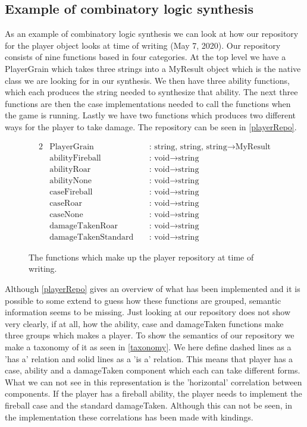 \subsection{Example of combinatory logic synthesis}
As an example of combinatory logic synthesis we can look at how our repository for the player object looks at time of writing (May 7, 2020). Our repository consists of nine functions based in four categories. At the top level we have a PlayerGrain which takes three strings into a MyResult object which is the native class we are looking for in our synthesis. We then have three ability functions, which each produces the string needed to synthesize that ability. The next three functions are then the case implementations needed to call the functions when the game is running. Lastly we have two functions which produces two different ways for the player to take damage. The repository can be seen in \autoref{playerRepo}.
\begin{figure}[H]
	\centering
	\begin{alignat*}{2}
	&\text{PlayerGrain}\; &&\text{: string, string, string} \to \text{MyResult}\\
	&\text{abilityFireball}\; &&\text{: void} \to \text{string}\\
	&\text{abilityRoar}\; &&\text{: void} \to \text{string}\\
	&\text{abilityNone}\; &&\text{: void} \to \text{string}\\
	&\text{caseFireball}\; &&\text{: void} \to \text{string}\\
	&\text{caseRoar}\; &&\text{: void} \to \text{string}\\
	&\text{caseNone}\; &&\text{: void} \to \text{string}\\
	&\text{damageTakenRoar}\; &&\text{: void} \to \text{string}\\
	&\text{damageTakenStandard}\; &&\text{: void} \to \text{string}
	\end{alignat*}
	\caption{The functions which make up the player repository at time of writing.}
	\label{playerRepo}
\end{figure}

Although \autoref{playerRepo} gives an overview of what has been implemented and it is possible to some extend to guess how these functions are grouped, semantic information seems to be missing. Just looking at our repository does not show very clearly, if at all, how the ability, case and damageTaken functions make three groups which makes a player. To show the semantics of our repository we make a taxonomy of it as seen in \autoref{taxonomy}. We here define dashed lines as a 'has a' relation and solid lines as a 'is a' relation. This means that player has a case, ability and a damageTaken component which each can take different forms. What we can not see in this representation is the 'horizontal' correlation between components. If the player has a fireball ability, the player needs to implement the fireball case and the standard damageTaken. Although this can not be seen, in the implementation these correlations has been made with kindings.

